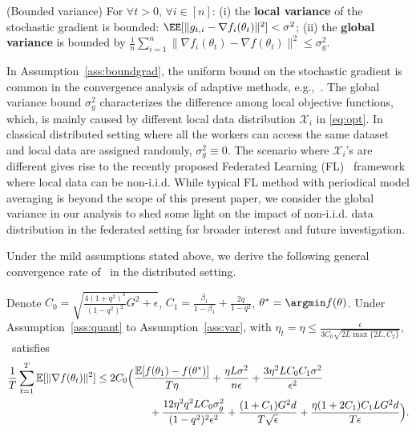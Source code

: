 \documentclass[11pt]{article}
\begin{document}
\begin{assumption}\label{ass:var}(Bounded variance)
For $\forall t >0$, $\forall i \in [n]$: (i) the \textbf{local variance} of the stochastic gradient is bounded: $\EE[\|g_{t,i} - \nabla f_i(\theta_t)\|^2] < \sigma^2$; (ii) the \textbf{global variance} is bounded by $\frac{1}{n}\sum_{i=1}^n\|\nabla f_i(\theta_t)-\nabla f(\theta_t)\|^2\leq \sigma_g^2$.
\end{assumption}

In Assumption~\ref{ass:boundgrad}, the uniform bound on the stochastic gradient is common in the convergence analysis of adaptive methods, e.g.,~\cite{reddi2019convergence,Arxiv:Zhou_18,Proc:Chen_ICLR19}. The global variance bound $\sigma_g^2$ characterizes the difference among local objective functions, which, is mainly caused by different local data distribution $\mathcal X_i$ in \eqref{eq:opt}. In classical distributed setting where all the workers can access the same dataset and local data are assigned randomly, $\sigma_g^2\equiv 0$. The scenario where $\mathcal X_i$'s are different gives rise to the recently proposed Federated Learning (FL)~\cite{mcmahan2017communication} framework where local data can be non-i.i.d. While typical FL method with periodical model averaging is beyond the scope of this present paper, we consider the global variance in our analysis to shed some light on the impact of non-i.i.d. data distribution in the federated setting for broader interest and future investigation.


Under the mild assumptions stated above, we derive the following general convergence rate of \algo\ in the distributed setting.

\begin{Theorem}  \label{theo:rate}
Denote $C_0=\sqrt{\frac{4(1+q^2)^3}{(1-q^2)^2}G^2+\epsilon}$, $C_1=\frac{\beta_1}{1-\beta_1}+\frac{2q}{1-q^2}$, $\theta^*=\argmin f(\theta)$. Under Assumption~\ref{ass:quant} to Assumption~\ref{ass:var}, with $\eta_t=\eta\leq \frac{\epsilon}{3C_0\sqrt{2L \max\{2L,C_2\}}}$, \algo\ satisfies
\begin{align*}
    \frac{1}{T}\sum_{t=1}^T \mathbb E[\|\nabla f(\theta_t)\|^2]
    &\leq 2C_0\Big(\frac{\mathbb E[f(\theta_1)-f(\theta^*)]}{T\eta}+\frac{\eta L \sigma^2}{n\epsilon}+\frac{3\eta^2 LC_0C_1\sigma^2}{\epsilon^2}  \\
    &\hspace{0.7in} + \frac{12\eta^2q^2LC_0\sigma_g^2}{(1-q^2)^2\epsilon^2}+\frac{ (1+C_1)G^2d}{T\sqrt\epsilon}+\frac{\eta (1+2C_1)C_1LG^2d}{T\epsilon} \Big).
\end{align*}
\end{Theorem}
\end{document}
